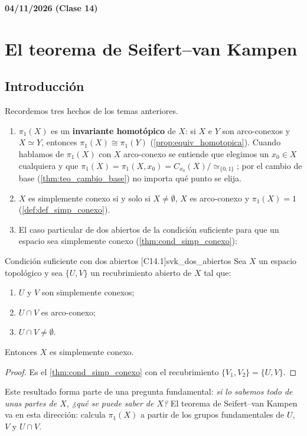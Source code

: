 \textbf{04/11/2026 (Clase 14)}
\section{El teorema de Seifert--van Kampen}

\subsection{Introducción}

Recordemos tres hechos de los temas anteriores.
\begin{enumerate}
    \item[a)] $\pi_1(X)$ es un \textbf{invariante homotópico} de $X$: si $X$ e $Y$ son arco-conexos y $X \simeq Y$, entonces $\pi_1(X) \cong \pi_1(Y)$ (\cref{prop:equiv_homotopica}). Cuando hablamos de $\pi_1(X)$ con $X$ arco-conexo se entiende que elegimos un $x_0 \in X$ cualquiera y que $\pi_1(X) = \pi_1(X,x_0) = C_{x_0}(X)/\!\simeq_{\{0,1\}}$; por el cambio de base (\cref{thm:teo_cambio_base}) no importa qué punto se elija.
    \item[b)] $X$ es simplemente conexo si y solo si $X \neq \emptyset$, $X$ es arco-conexo y $\pi_1(X) = 1$ (\cref{def:def_simp_conexo}).
    \item[c)] El caso particular de dos abiertos de la condición suficiente para que un espacio sea simplemente conexo (\cref{thm:cond_simp_conexo}):
\end{enumerate}

\begin{proposicion}{Condición suficiente con dos abiertos [C14.1]}{svk_dos_abiertos}
Sea $X$ un espacio topológico y sea $\{U, V\}$ un recubrimiento abierto de $X$ tal que:
\begin{enumerate}
    \item[1)] $U$ y $V$ son simplemente conexos;
    \item[2)] $U \cap V$ es arco-conexo;
    \item[3)] $U \cap V \neq \emptyset$.
\end{enumerate}
Entonces $X$ es simplemente conexo.
\end{proposicion}

\begin{proof}
Es el \cref{thm:cond_simp_conexo} con el recubrimiento $\{V_1, V_2\} = \{U, V\}$.
\end{proof}

Este resultado forma parte de una pregunta fundamental: \emph{si lo sabemos todo de unas partes de $X$, ¿qué se puede saber de $X$?} El teorema de Seifert--van Kampen va en esta dirección: calcula $\pi_1(X)$ a partir de los grupos fundamentales de $U$, $V$ y $U \cap V$.

